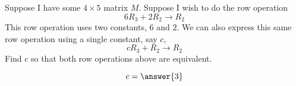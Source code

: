 \documentclass{ximera}
\begin{document}
\begin{exercise}
  Suppose I have some $4\times 5$ matrix $M$. Suppose I wish to do the
  row operation
  \[
  6R_3 + 2R_2 \to R_2
  \]
  This row operation uses two constants, $6$ and $2$.  We can also
  express this same row operation using a single constant, say $c$,
  \[
  c R_3 +R_2 \to R_2
  \]
  Find $c$ so that both row operations above are equivalent.
  \begin{prompt}
  \[
  c=\answer{3}
  \]
  \end{prompt}
\end{exercise}
\end{document}
